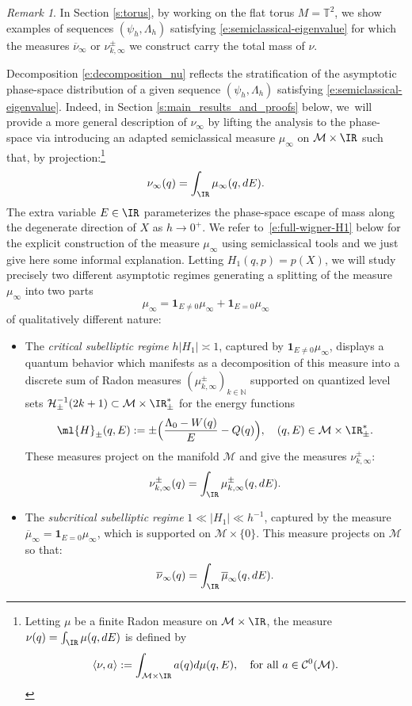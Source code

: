 \documentclass[10pt]{amsart}
\theoremstyle{plain}
\theoremstyle{definition}
\theoremstyle{remark}
\newtheorem{rema}[theo]{Remark}
\begin{document}
\begin{rema}
In Section \ref{s:torus}, by working on the flat torus $M = \mathbb{T}^2$, we show examples of sequences $(\psi_h,\Lambda_h)$ satisfying \eqref{e:semiclassical-eigenvalue} for which the measures $\overline{\nu}_\infty$ or $\nu_{k,\infty}^\pm$ we construct carry the total mass of $\nu$.
\end{rema}

Decomposition \eqref{e:decomposition_nu} reflects the stratification of the asymptotic phase-space distribution of a given sequence $(\psi_h,\Lambda_h)$ satisfying \eqref{e:semiclassical-eigenvalue}. Indeed, in Section \ref{s:main_results_and_proofs} below, we~will provide a more general description of $\nu_\infty$ by lifting the analysis to the phase-space via introducing an adapted semiclassical measure $\mu_\infty$ on $\mathcal{M} \times \IR$ such that, by projection:\footnote{Letting $\mu$ be a finite Radon measure on $\mathcal{M} \times \IR$, the measure $\nu(q) = \int_\IR \mu(q,dE)$ is defined by
\[
\langle \nu , a \rangle := \int_{\mathcal{M} \times \IR} a(q) d\mu(q,E),\quad\text{for all $a \in \mathcal{C}^0(\mathcal{M})$.}
\]}
\[
\nu_\infty(q) = \int_\IR \mu_\infty(q,dE).
\]
The extra variable $E \in \IR$ parameterizes the phase-space escape of mass along the degenerate direction of $X$ as $h \to 0^+$. We refer to~\eqref{e:full-wigner-H1} below for the explicit construction of the measure $\mu_\infty$ using semiclassical tools and we just give here some informal explanation. Letting $H_1(q,p) = p(X)$, we will study precisely two different asymptotic regimes generating a splitting of the measure $\mu_\infty $ into two parts
\[
\mu_\infty = \mathbf{1}_{E \neq 0} \mu_\infty + \mathbf{1}_{E = 0} \mu_\infty
\]
of qualitatively different nature:
\begin{itemize}
\item The \emph{critical subelliptic regime} $h\vert H_1 \vert \asymp 1$, captured by $\mathbf{1}_{E \neq 0} \mu_\infty$, displays a quantum behavior which manifests as a decomposition of this measure into a discrete sum of Radon measures $(\mu^\pm_{k,\infty})_{k\in \mathbb{N}}$ supported on quantized level sets $\mathcal{H}_\pm^{-1}(2k+1) \subset \mathcal{M} \times \IR^*_\pm$ for the energy functions
\begin{equation}\label{e:preserved-quantity}
\ml{H}_\pm(q,E) := \pm \Bigl(\frac{\Lambda_0-W(q)}{E} - Q(q) \Bigr), \quad (q,E) \in \mathcal{M} \times \IR^*_\pm.
\end{equation}
These measures project on the manifold $\mathcal{M}$ and give the measures $\nu^\pm_{k,\infty}$:
\[
\nu^\pm_{k,\infty}(q) = \int_\IR \mu_{k,\infty}^\pm (q,dE).
\]

\item The \emph{subcritical subelliptic regime} $1 \ll \vert H_1 \vert \ll h^{-1}$, captured by the measure $\overline{\mu}_\infty = \mathbf{1}_{E = 0} \mu_\infty$, which is supported on $\mathcal{M} \times \{0 \}$. This measure projects on $\mathcal{M}$ so that:
\[
\overline{\nu}_\infty(q) = \int_\IR \overline{\mu}_\infty(q,dE).
\]
\end{itemize}
\end{document}
